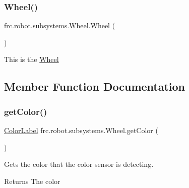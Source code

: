 \subsubsection{\texorpdfstring{Wheel()}{Wheel()}}
{\footnotesize\ttfamily frc.\+robot.\+subsystems.\+Wheel.\+Wheel (\begin{DoxyParamCaption}{ }\end{DoxyParamCaption})\hspace{0.3cm}{\ttfamily [inline]}}

This is the \mbox{\hyperlink{classfrc_1_1robot_1_1subsystems_1_1_wheel}{Wheel}} 

\subsection{Member Function Documentation}
\mbox{\label{classfrc_1_1robot_1_1subsystems_1_1_wheel_aadef4c1c2a73fc8b4e656cb96987ebe7}} 
\subsubsection{\texorpdfstring{getColor()}{getColor()}}
{\footnotesize\ttfamily \mbox{\hyperlink{enumfrc_1_1robot_1_1enums_1_1_color_label}{Color\+Label}} frc.\+robot.\+subsystems.\+Wheel.\+get\+Color (\begin{DoxyParamCaption}{ }\end{DoxyParamCaption})\hspace{0.3cm}{\ttfamily [inline]}}



Gets the color that the color sensor is detecting. 

\begin{DoxyReturn}{Returns}
The color 
\end{DoxyReturn}
\mbox{\label{classfrc_1_1robot_1_1subsystems_1_1_wheel_a6a27eea19185863babdb6edacf07024b}} 
